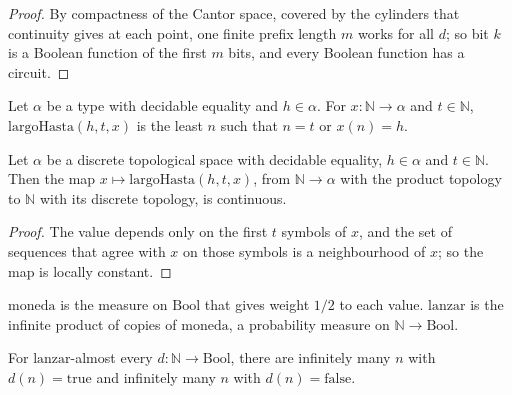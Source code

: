 \begin{proof}
  \leanok
  By compactness of the Cantor space, covered by the cylinders that continuity gives at each point, one finite prefix
  length $m$ works for all $d$; so bit $k$ is a Boolean function of the first $m$ bits, and every Boolean function has a circuit.
\end{proof}

\begin{definition}
  \label{def:infinite-largo-hasta}
  \leanok
  \own{}
  Let $\alpha$ be a type with decidable equality and $h \in \alpha$. For $x : \mathbb{N} \to \alpha$ and $t \in \mathbb{N}$,
  $\mathrm{largoHasta}(h, t, x)$ is the least $n$ such that $n = t$ or $x(n) = h$.
\end{definition}

\begin{theorem}
  \label{thm:infinite-reloj-continuo}
  \leanok
  \own{}
  Let $\alpha$ be a discrete topological space with decidable equality, $h \in \alpha$ and $t \in \mathbb{N}$. Then the map
  $x \mapsto \mathrm{largoHasta}(h, t, x)$, from $\mathbb{N} \to \alpha$ with the product topology to $\mathbb{N}$ with its
  discrete topology, is continuous.
\end{theorem}

\begin{proof}
  \leanok
  The value depends only on the first $t$ symbols of $x$, and the set of sequences that agree with $x$ on those symbols
  is a neighbourhood of $x$; so the map is locally constant.
\end{proof}

\begin{definition}
  \label{def:infinite-lanzar}
  \leanok
  \own{}
  $\mathrm{moneda}$ is the measure on $\mathrm{Bool}$ that gives weight $1/2$ to each value. $\mathrm{lanzar}$ is the
  infinite product of copies of $\mathrm{moneda}$, a probability measure on $\mathbb{N} \to \mathrm{Bool}$.
\end{definition}

\begin{theorem}
  \label{thm:infinite-casi-seguro-oscila}
  \leanok
  \own{}
  For $\mathrm{lanzar}$-almost every $d : \mathbb{N} \to \mathrm{Bool}$, there are infinitely many $n$ with $d(n) = \mathrm{true}$
  and infinitely many $n$ with $d(n) = \mathrm{false}$.
\end{theorem}

